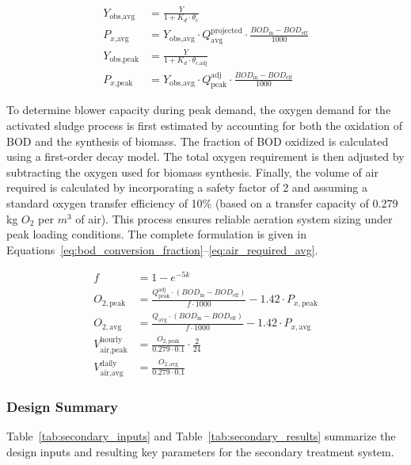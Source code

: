 \documentclass[11pt]{article}
\begin{document}
\begin{align}
Y_{\text{obs,avg}} &= \frac{Y}{1 + K_d \cdot \theta_c} \label{eq:observed_yield_avg}\\
P_{x\text{,avg}} &= Y_{\text{obs,avg}} \cdot Q_{\text{avg}}^{\text{projected}} \cdot \frac{BOD_{\text{in}} - BOD_{\text{eff}}}{1000} \label{eq:biomas_rate_avg}\\
Y_{\text{obs,peak}} &= \frac{Y}{1 + K_d \cdot \theta_{c\text{,adj}}} \label{eq:observed_yield_peak}\\
P_{x\text{,peak}} &= Y_{\text{obs,avg}} \cdot Q_{\text{peak}}^{\text{adj}} \cdot \frac{BOD_{\text{in}} - BOD_{\text{eff}}}{1000} \label{eq:biomas_rate_peak}
\end{align}

To determine blower capacity during peak demand, 
the oxygen demand for the activated sludge process 
is first estimated by accounting for both the 
oxidation of BOD and the synthesis of biomass. 
The fraction of BOD oxidized is calculated using 
a first-order decay model. The total oxygen requirement 
is then adjusted by subtracting the oxygen used for 
biomass synthesis. Finally, the volume of air required 
is calculated by incorporating a safety factor of 2 and 
assuming a standard oxygen transfer efficiency of 10\% 
(based on a transfer capacity of 0.279 kg $O_2$ per $m^3$ of air). 
This process ensures reliable aeration system sizing 
under peak loading conditions.
The complete formulation is given 
in Equations~\eqref{eq:bod_conversion_fraction}--\eqref{eq:air_required_avg}.

\begin{align}
f &= 1 - e^{-5k} \label{eq:bod_conversion_fraction} \\
O_{2,\text{peak}} &= \frac{Q_{\text{peak}}^{\text{adj}} \cdot (BOD_{\text{in}} - BOD_{\text{eff}})}{f \cdot 1000} - 1.42 \cdot P_{x,\text{peak}} \label{eq:oxygen_demand_peak} \\
O_{2,\text{avg}} &= \frac{Q_{\text{avg}} \cdot (BOD_{\text{in}} - BOD_{\text{eff}})}{f \cdot 1000} - 1.42 \cdot P_{x,\text{avg}} \label{eq:oxygen_demand_avg} \\
V_{\text{air,peak}}^{\text{hourly}} &= \frac{O_{2,\text{peak}}}{0.279 \cdot 0.1} \cdot \frac{2}{24} \label{eq:air_required_peak} \\
V_{\text{air,avg}}^{\text{daily}}  &= \frac{O_{2,\text{avg}}}{0.279 \cdot 0.1} \label{eq:air_required_avg}
\end{align}


\subsubsection{Design Summary}
Table~\ref{tab:secondary_inputs} and Table~\ref{tab:secondary_results} summarize the design inputs and resulting key parameters for the secondary treatment system.
\end{document}
